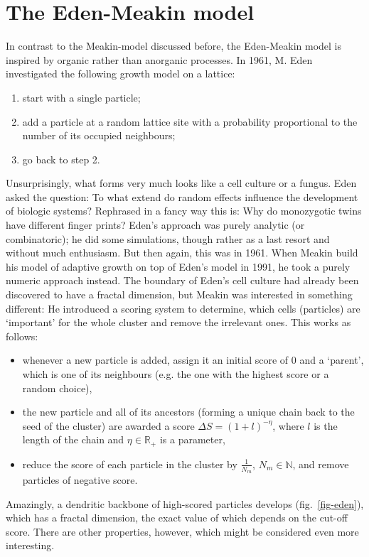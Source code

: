 \documentclass[twocolumn,10pt]{scrartcl}
\begin{document}
    \section{The Eden-Meakin model}
        In contrast to the Meakin-model discussed before, the Eden-Meakin model is inspired by organic rather than
        anorganic processes. In 1961, M. Eden investigated the following growth model on a lattice:
        \begin{enumerate}
            \item start with a single particle;
            \item add a particle at a random lattice site with a probability proportional to the number of its
                occupied neighbours;
            \item go back to step 2.
        \end{enumerate}
        Unsurprisingly, what forms very much looks like a cell culture or a fungus. Eden asked the question:
        To what extend do random effects influence the development of biologic systems? Rephrased in a fancy
        way this is: Why do monozygotic twins have different finger prints? Eden's approach was purely analytic
        (or combinatoric); he did some simulations, though rather as a last resort and without much enthusiasm.
        But then again, this was in 1961. When Meakin build his model of adaptive growth on top of Eden's model
        in 1991, he took a purely numeric approach instead. The boundary of Eden's cell culture had already
        been discovered to have a fractal dimension, but Meakin was interested in something different: He
        introduced a scoring system to determine, which cells (particles) are `important' for the whole cluster
        and remove the irrelevant ones. This works as follows:
        \begin{itemize}
            \item whenever a new particle is added, assign it an initial score of 0 and a `parent', which is
                one of its neighbours (e.g. the one with the highest score or a random choice),
            \item the new particle and all of its ancestors (forming a unique chain back to the seed of the
                cluster) are awarded a score $\Delta S=(1+l)^{-\eta}$, where $l$ is the length of the chain
                and $\eta\in\mathbb{R}_+$ is a parameter,
            \item reduce the score of each particle in the cluster by $\frac{1}{N_m}$, $N_m\in\mathbb{N}$,
                and remove particles of negative score.
        \end{itemize}
        Amazingly, a dendritic backbone of high-scored particles develops (fig.~\ref{fig-eden}), which has a
        fractal dimension,
        the exact value of which depends on the cut-off score. There are other properties, however, which
        might be considered even more interesting.
\end{document}
